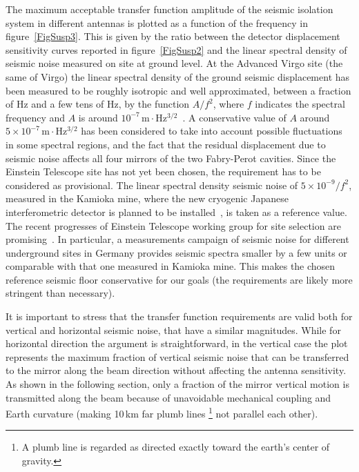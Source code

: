 %
The maximum acceptable transfer function amplitude of the seismic isolation system in different antennas is plotted as a function of the frequency in figure~\ref{FigSusp3}. This is given by the ratio between the detector displacement sensitivity curves reported in figure~\ref{FigSusp2} and the linear spectral density of seismic noise measured on site at ground level. At the Advanced Virgo site (the same of Virgo) the linear spectral density of the ground seismic displacement has been measured to be roughly isotropic and well approximated, between a fraction of Hz and a few tens of Hz, by the function $A/f^{2}$, where $f$ indicates the spectral frequency and $A$ is around $10^{-7}\,\mathrm{m\cdot Hz^{3/2}}$~\cite{Acernese2004}. A conservative value of $A$ around $5\times10^{-7}\,\mathrm{m\cdot Hz^{3/2}}$ has been considered to take into account possible fluctuations in some spectral regions, and the fact that the residual displacement due to seismic noise affects all four mirrors of the two Fabry-Perot cavities. Since the Einstein Telescope site has not yet been chosen, the requirement has to be considered as provisional. The linear spectral density seismic noise of $5\times 10^{-9}/f^{2}$, measured in the Kamioka mine, where the new cryogenic Japanese interferometric detector is planned to be installed~\cite{Ohashi2003July31-August7}, is taken as a reference value. The recent progresses of Einstein Telescope working group for site selection are promising~\cite{Beker2009}. In particular, a measurements campaign of seismic noise for different underground sites in Germany provides seismic spectra smaller by a few units or comparable with that one measured in Kamioka mine. This makes the chosen reference seismic floor conservative for our goals (the requirements are likely more stringent than necessary).

It is important to stress that the transfer function requirements are valid both for vertical and horizontal seismic noise, that have a similar magnitudes. While for horizontal direction the argument is straightforward, in the vertical case the plot represents the maximum fraction of vertical seismic noise that can be transferred to the mirror along the beam direction without affecting the antenna sensitivity. As shown in the following section, only a fraction of the mirror vertical motion is transmitted along the beam because of unavoidable mechanical coupling and Earth curvature (making 10\,km far plumb lines \footnote{A plumb line is  regarded as directed exactly toward the earth's center of gravity.} not parallel each other). 

